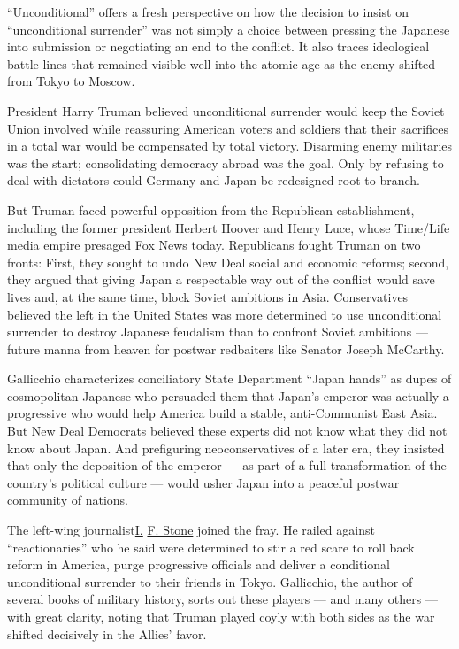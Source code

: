 ``Unconditional'' offers a fresh perspective on how the decision to
insist on ``unconditional surrender'' was not simply a choice between
pressing the Japanese into submission or negotiating an end to the
conflict. It also traces ideological battle lines that remained visible
well into the atomic age as the enemy shifted from Tokyo to Moscow.

President Harry Truman believed unconditional surrender would keep the
Soviet Union involved while reassuring American voters and soldiers that
their sacrifices in a total war would be compensated by total victory.
Disarming enemy militaries was the start; consolidating democracy abroad
was the goal. Only by refusing to deal with dictators could Germany and
Japan be redesigned root to branch.

But Truman faced powerful opposition from the Republican establishment,
including the former president Herbert Hoover and Henry Luce, whose
Time/Life media empire presaged Fox News today. Republicans fought
Truman on two fronts: First, they sought to undo New Deal social and
economic reforms; second, they argued that giving Japan a respectable
way out of the conflict would save lives and, at the same time, block
Soviet ambitions in Asia. Conservatives believed the left in the United
States was more determined to use unconditional surrender to destroy
Japanese feudalism than to confront Soviet ambitions --- future manna
from heaven for postwar redbaiters like Senator Joseph McCarthy.

Gallicchio characterizes conciliatory State Department ``Japan hands''
as dupes of cosmopolitan Japanese who persuaded them that Japan's
emperor was actually a progressive who would help America build a
stable, anti-Communist East Asia. But New Deal Democrats believed these
experts did not know what they did not know about Japan. And prefiguring
neoconservatives of a later era, they insisted that only the deposition
of the emperor --- as part of a full transformation of the country's
political culture --- would usher Japan into a peaceful postwar
community of nations.

The left-wing journalist\href{http://www.ifstone.org}{I.}
\href{http://www.ifstone.org}{F. Stone} joined the fray. He railed
against ``reactionaries'' who he said were determined to stir a red
scare to roll back reform in America, purge progressive officials and
deliver a conditional unconditional surrender to their friends in Tokyo.
Gallicchio, the author of several books of military history, sorts out
these players --- and many others --- with great clarity, noting that
Truman played coyly with both sides as the war shifted decisively in the
Allies' favor.

